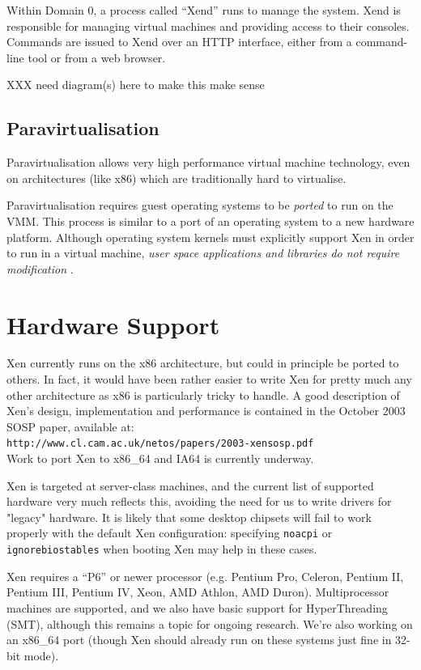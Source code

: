 \documentclass[11pt,twoside,final,openright]{xenstyle}
\begin{document}
Within Domain 0, a process called ``Xend'' runs to manage the system.
Xend is responsible for managing virtual machines and providing access
to their consoles.  Commands are issued to Xend over an HTTP
interface, either from a command-line tool or from a web browser.

XXX need diagram(s) here to make this make sense

\subsection{Paravirtualisation}

Paravirtualisation allows very high performance virtual machine
technology, even on architectures (like x86) which are traditionally
hard to virtualise.

Paravirtualisation requires guest operating systems to be { \em ported
} to run on the VMM.  This process is similar to a port of an
operating system to a new hardware platform.  Although operating
system kernels must explicitly support Xen in order to run in a
virtual machine, { \em user space applications and libraries
do not require modification }.

\section{Hardware Support}

Xen currently runs on the x86 architecture, but could in principle be
ported to others. In fact, it would have been rather easier to write
Xen for pretty much any other architecture as x86 is particularly
tricky to handle. A good description of Xen's design, implementation
and performance is contained in the October 2003 SOSP paper, available
at:\\
{\tt http://www.cl.cam.ac.uk/netos/papers/2003-xensosp.pdf}\\
Work to port Xen to x86\_64 and IA64 is currently underway.

Xen is targeted at server-class machines, and the current list of
supported hardware very much reflects this, avoiding the need for us
to write drivers for "legacy" hardware. It is likely that some desktop
chipsets will fail to work properly with the default Xen
configuration: specifying {\tt noacpi} or {\tt ignorebiostables} when
booting Xen may help in these cases.

Xen requires a ``P6'' or newer processor (e.g. Pentium Pro, Celeron,
Pentium II, Pentium III, Pentium IV, Xeon, AMD Athlon, AMD Duron).
Multiprocessor machines are supported, and we also have basic support
for HyperThreading (SMT), although this remains a topic for ongoing
research. We're also working on an x86\_64 port (though Xen should
already run on these systems just fine in 32-bit mode).
\end{document}
